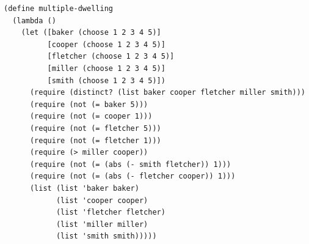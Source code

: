 \documentclass[acmsmall,screen,authorversion]{acmart}
\begin{document}


\begin{minipage}{0.4\textwidth}
{\footnotesize
\begin{verbatim}
(define multiple-dwelling
  (lambda ()
    (let ([baker (choose 1 2 3 4 5)]
          [cooper (choose 1 2 3 4 5)]
          [fletcher (choose 1 2 3 4 5)]
          [miller (choose 1 2 3 4 5)]
          [smith (choose 1 2 3 4 5)])
      (require (distinct? (list baker cooper fletcher miller smith)))
      (require (not (= baker 5)))
      (require (not (= cooper 1)))
      (require (not (= fletcher 5)))
      (require (not (= fletcher 1)))
      (require (> miller cooper))
      (require (not (= (abs (- smith fletcher)) 1)))
      (require (not (= (abs (- fletcher cooper)) 1)))
      (list (list 'baker baker)
            (list 'cooper cooper)
            (list 'fletcher fletcher)
            (list 'miller miller)
            (list 'smith smith)))))
\end{verbatim}
}
\end{minipage}\\\\

\end{document}
